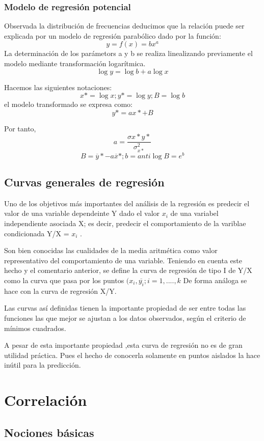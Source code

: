 \documentclass{article}
\begin{document}
\subsubsection{Modelo de regresión potencial}
	Observada la distribución de frecuencias deducimos que la relación puede ser explicada por un modelo de regresión parabólico dado por la función:
$$ y = f(x) = bx^a $$
	La determinación de los parámetors a y b se realiza linealizando previamente el modelo mediante transformación logarítmica.
	$$ \log y = \log b + a\log x $$
	
	Hacemos las siguientes notaciones:
$$x* = \log x; y* = \log y ; B = \log b $$
	el modelo transformado se expresa como:
$$y* = ax* + B $$
	
	Por tanto,
	$$ a = \frac{\sigma{x*y*} }{\sigma_{x*}^2}$$
	$$ B = \overline{y}* - a\overline{x}* ; b = anti \log B = e^{b} $$

\subsection{Curvas generales de regresión}
Uno de los objetivos más importantes del análisis de la regresión es predecir el valor de una variable dependeinte Y dado el valor $x_i$ de una variabel independiente asociada X;  es decir, predecir el comportamiento de la variblae condicionada Y/X = $x_i$ .

Son bien conocidas las cualidades de la media aritmética como valor representativo del comportamiento de una variable. Teniendo en cuenta este hecho y el comentario anterior, se define la curva de regresión de tipo I de Y/X como la curva que pasa por los puntos $(x_i,\overline{y_i}; i = 1,....,k $ De forma análoga se hace con la curva de regresión X/Y.

Las curvas así definidas tienen la importante propiedad de ser entre todas las funciones las que mejor se ajustan a los datos observados, según el criterio de mínimos cuadrados.

A pesar de esta importante propiedad ,esta curva de regresión no es de gran utilidad práctica. Pues el hecho de conocerla solamente en puntos aislados la hace inútil para la predicción.


\section{Correlación}
\subsection{Nociones básicas}
\end{document}
